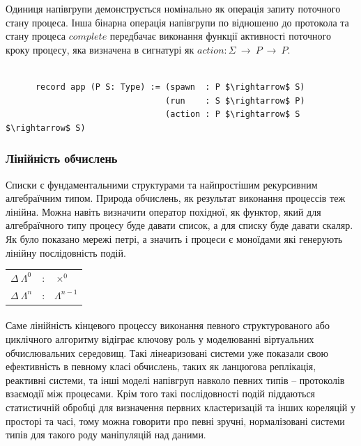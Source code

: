 \documentclass[11pt,oneside]{article}
\begin{document}
  Одиниця напівгрупи
  демонструється номінально як операція запиту поточного стану процеса.
  Інша бінарна операція напівгрупи по відношеню до протокола та стану процеса $complete$
  передбачає виконання функції активності поточного кроку процесу, яка
  визначена в сигнатурі як $action: \Sigma\ \rightarrow\ P\ \rightarrow\ P$.

\begin{center}
\begin{lstlisting}[mathescape=true]

      record app (P S: Type) := (spawn  : P $\rightarrow$ S)
                                (run    : S $\rightarrow$ P)
                                (action : P $\rightarrow$ S $\rightarrow$ S)

\end{lstlisting}
\end{center}

  \subsubsection{Лінійність обчислень}
   Списки є фундаментальними структурами та найпростішим рекурсивним алгебраїчним типом.
   Природа обчислень, як результат виконання процессів теж лінійна. Можна навіть визначити
   оператор похідної, як функтор, який для алгебраїчного типу процесу буде давати список,
   а для списку буде давати скаляр. Як було показано \cite{meseguer} мережі петрі,
   а значить і процеси є моноїдами які генерують лінійну послідовність подій.

\begin{center}
\begin{tabular}{lcl}
$\Delta \ \Lambda^0$         &:& $\times^0$ \\
$\Delta \ \Lambda^{n}$       &:& $\Lambda^{n-1}$ \\
\end{tabular}
\end{center}

   \paragraph{}
   Саме лінійність кінцевого
   процессу виконання певного структурованого або циклічного алгоритму відіграє ключову
   роль у моделюванні віртуальних обчислювальних середовищ. Такі лінеаризовані системи
   уже показали свою ефективність в певному класі обчислень, таких як ланцюгова реплікація,
   реактивні системи, та інші моделі напівгруп навколо певних типів -- протоколів взаємодії між процесами.
   Крім того такі послідовності подій піддаються статистичній обробці для визначення первних кластеризацій
   та інших кореляцій у просторі та часі, тому можна говорити про певні зручні, нормалізовані системи типів для
   такого роду маніпуляцій над даними.
\end{document}
